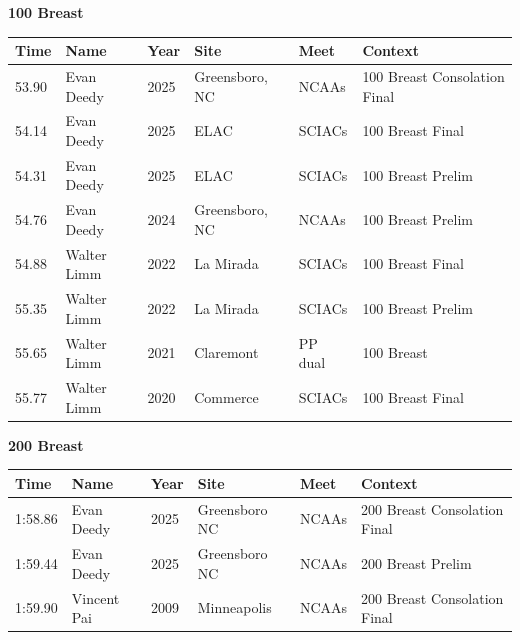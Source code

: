 \vspace{1.2em}
\noindent\begin{minipage}[t]{0.98\textwidth}
\centering
\textbf{\textcolor{teamprimary}{100 Breast}}\par
\vspace{0.5em}
\centering
\small
\renewcommand{\arraystretch}{1.0}
\setlength{\tabcolsep}{4pt}
\begin{tabular}{@{}p{2.0cm}p{3.2cm}p{1.2cm}p{2.0cm}p{2.0cm}p{2.5cm}@{}}
\toprule
\textbf{Time} & \textbf{Name} & \textbf{Year} & \textbf{Site} & \textbf{Meet} & \textbf{Context} \\
\midrule
53.90 & Evan Deedy & 2025 & Greensboro, NC & NCAAs & 100 Breast Consolation Final \\
54.14 & Evan Deedy & 2025 & ELAC & SCIACs & 100 Breast Final \\
54.31 & Evan Deedy & 2025 & ELAC & SCIACs & 100 Breast Prelim \\
54.76 & Evan Deedy & 2024 & Greensboro, NC & NCAAs & 100 Breast Prelim \\
54.88 & Walter Limm & 2022 & La Mirada & SCIACs & 100 Breast Final \\
55.35 & Walter Limm & 2022 & La Mirada & SCIACs & 100 Breast Prelim \\
55.65 & Walter Limm & 2021 & Claremont & PP dual & 100 Breast \\
55.77 & Walter Limm & 2020 & Commerce & SCIACs & 100 Breast Final \\
\bottomrule
\end{tabular}
\end{minipage}
\vspace{1.2em}
\noindent\begin{minipage}[t]{0.98\textwidth}
\centering
\textbf{\textcolor{teamprimary}{200 Breast}}\par
\vspace{0.5em}
\centering
\small
\renewcommand{\arraystretch}{1.0}
\setlength{\tabcolsep}{4pt}
\begin{tabular}{@{}p{2.0cm}p{3.2cm}p{1.2cm}p{2.0cm}p{2.0cm}p{2.5cm}@{}}
\toprule
\textbf{Time} & \textbf{Name} & \textbf{Year} & \textbf{Site} & \textbf{Meet} & \textbf{Context} \\
\midrule
1:58.86 & Evan Deedy & 2025 & Greensboro NC & NCAAs & 200 Breast Consolation Final \\
1:59.44 & Evan Deedy & 2025 & Greensboro NC & NCAAs & 200 Breast Prelim \\
1:59.90 & Vincent Pai & 2009 & Minneapolis & NCAAs & 200 Breast Consolation Final \\
\bottomrule
\end{tabular}
\end{minipage}
